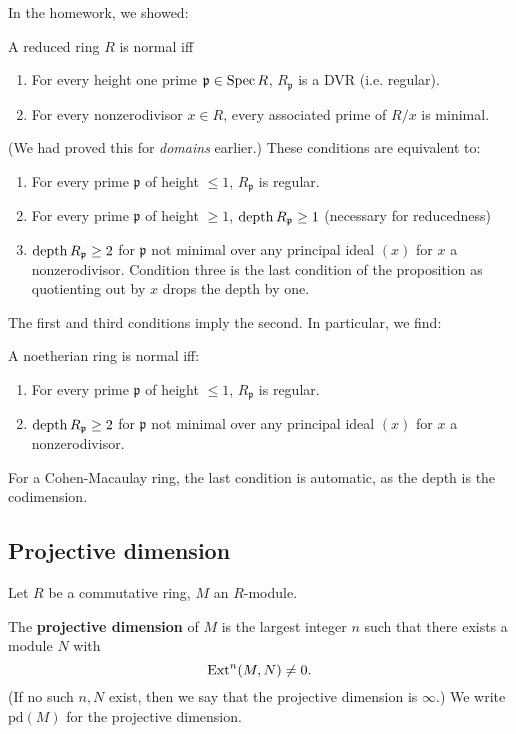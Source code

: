 In the homework, we showed:
\begin{proposition}
A reduced ring $R$ is normal iff
\begin{enumerate}
\item For every height one prime $\mathfrak{p}  \in \operatorname{Spec} R$,
$R_{\mathfrak{p}}$ is a DVR (i.e. regular).
\item For every nonzerodivisor $x \in R$, every associated prime
of $R/x$ is
minimal.
\end{enumerate}
\end{proposition}
(We had proved this for \emph{domains} earlier.)
These conditions are equivalent to:
\begin{enumerate}
\item For every prime $\mathfrak{p}$ of height $\leq 1$,
$R_{\mathfrak{p}} $ is regular.
\item For every prime $\mathfrak{p}$ of height $\geq 1$,
$\operatorname{depth} R_{\mathfrak{p}} \geq 1$ (necessary for reducedness)
\item $\operatorname{depth} R_{\mathfrak{p}} \geq 2$ for $\mathfrak{p}$ not
minimal over any
principal ideal $(x)$ for $x$ a nonzerodivisor. Condition three
is the last
condition of the proposition as quotienting out by $x$ drops the
depth by one.
\end{enumerate}

The first and third conditions imply the second. In particular,
we find:

\begin{theorem} A noetherian ring is normal
iff:
\begin{enumerate}
\item For every prime $\mathfrak{p}$ of height $\leq 1$,
$R_{\mathfrak{p}} $ is regular.
\item $\operatorname{depth} R_{\mathfrak{p}} \geq 2$ for $\mathfrak{p}$ not
minimal over any
principal ideal $(x)$ for $x$ a nonzerodivisor. \end{enumerate}
\end{theorem}
For a Cohen-Macaulay ring, the last condition is automatic, as
the depth is the
codimension.

\subsection{Projective dimension}

\newcommand{\pr}{\mathrm{pd}}
Let $R$ be a commutative ring, $M$ an $R$-module.

\begin{definition}
The \textbf{projective dimension} of $M$ is the largest integer
$n$ such that
there exists  a module $N$ with
\[ \operatorname{Ext}^n(M,N) \neq 0.  \]
(If no such $n,N$ exist, then we say that the projective
dimension is $\infty$.)
We write $\pr(M)$ for the projective dimension.
\end{definition}

